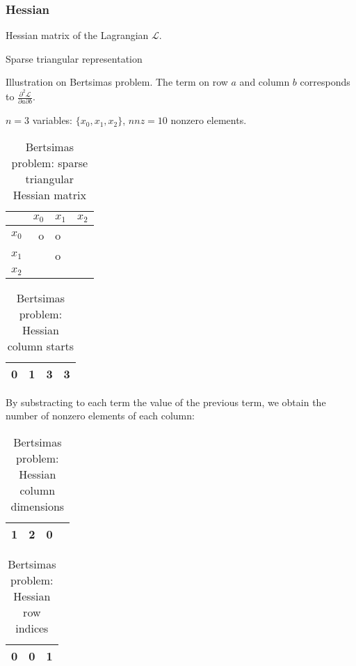 \subsubsection{Hessian}

Hessian matrix of the Lagrangian $\mathcal{L}$. 

Sparse triangular representation

Illustration on Bertsimas problem. The term on row $a$ and column $b$ corresponds to
$\frac{\partial^2 \mathcal{L}}{\partial a \partial b}$.

$n = 3$ variables: $\{x_0, x_1, x_2\}$,
$\mathit{nnz} = 10$ nonzero elements.

\begin{table}[htbp]
	\centering
	\begin{tabular}{c|R|G|B|}
	& $x_0$ & $x_1$ & $x_2$ \\
	\hline
	$x_0$ & o	& o & \\
	$x_1$ &  	& o	& \\
	$x_2$ &  	& 	& \\
	\hline
	\end{tabular}
	\caption{Bertsimas problem: sparse triangular Hessian matrix}
\end{table}

\begin{table}[htbp]
	\centering
	\begin{tabular}{|c|c|c|c|}
	\hline
	0 &
	\cellcolor{red!20}1 &
	\cellcolor{green!20}3 &
	\cellcolor{blue!20}3 \\
	\hline
	\end{tabular}
	\caption{Bertsimas problem: Hessian column starts}
\end{table}

By substracting to each term the value of the previous term, we obtain the number of nonzero elements of each column:

\begin{table}[htbp]
	\centering
	\begin{tabular}{|c|c|c|c|}
	\hline
	\cellcolor{red!20}1 &
	\cellcolor{green!20}2 &
	\cellcolor{blue!20}0 \\
	\hline
	\end{tabular}
	\caption{Bertsimas problem: Hessian column dimensions}
\end{table}

\begin{table}[htbp]
	\centering
	\begin{tabular}{|c|c|c|}
	\hline
	\cellcolor{red!20}0 &
	\cellcolor{green!20}0 & \cellcolor{green!20}1 \\
	\hline
	\end{tabular}
	\caption{Bertsimas problem: Hessian row indices}
\end{table}
